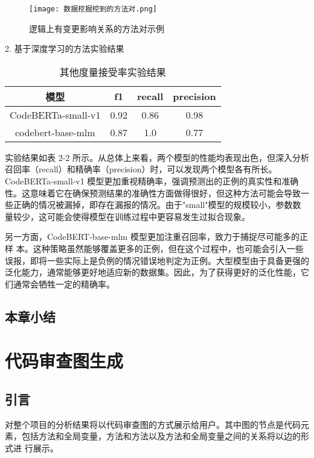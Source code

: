 \begin{figure}[h]
\centering
\texttt{[image: 数据挖掘挖到的方法对.png]}
\caption{逻辑上有变更影响关系的方法对示例}
\end{figure}


2. 基于深度学习的方法实验结果

\begin{table}[htbp]
    \caption{其他度量接受率实验结果}
    \vspace{0.5em}\centering\wuhao
    \begin{tabular}{cccc}
    \toprule
    模型& f1 & recall & precision \\
    \midrule
    CodeBERTa-small-v1 & 0.92 & 0.86 & 0.98 \\
    codebert-base-mlm  & 0.87 & 1.0  & 0.77 \\
    \bottomrule
    \end{tabular}
    \end{table}



实验结果如表 2-2 所示。从总体上来看，两个模型的性能均表现出色，但深入分析召回率（recall）和精确率（precision）时，可以发现两个模型各有所长。CodeBERTa-small-v1 模型更加重视精确率，强调预测出的正例的真实性和准确性。这意味着它在确保预测结果的准确性方面做得很好，但这种方法可能会导致一些正确的情况被漏掉，即存在漏报的情况。由于"small"模型的规模较小，参数数量较少，这可能会使得模型在训练过程中更容易发生过拟合现象。

另一方面，CodeBERT-base-mlm 模型更加注重召回率，致力于捕捉尽可能多的正样
本。这种策略虽然能够覆盖更多的正例，但在这个过程中，也可能会引入一些误报，即将一些实际上是负例的情况错误地判定为正例。大型模型由于具备更强的泛化能力，通常能够更好地适应新的数据集。因此，为了获得更好的泛化性能，它们通常会牺牲一定的精确率。






\section{本章小结}



\chapter{代码审查图生成}
\section{引言}
对整个项目的分析结果将以代码审查图的方式展示给用户。其中图的节点是代码元
素，包括方法和全局变量，方法和方法以及方法和全局变量之间的关系将以边的形式进
行展示。

